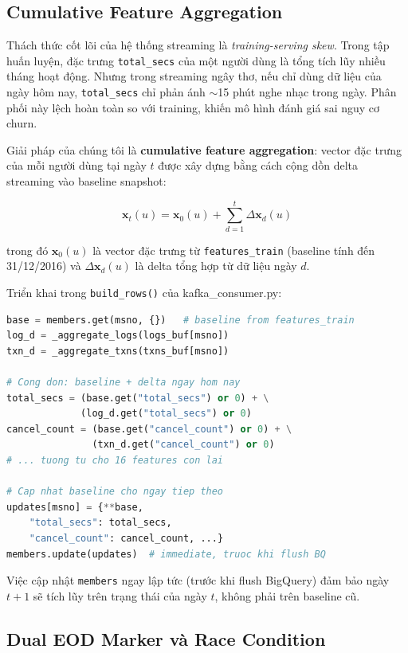 \documentclass[conference]{IEEEtran}
\begin{document}
\subsection{Cumulative Feature Aggregation}

Thách thức cốt lõi của hệ thống streaming là \emph{training-serving skew}.
Trong tập huấn luyện, đặc trưng \texttt{total\_secs} của một người dùng là
tổng tích lũy nhiều tháng hoạt động. Nhưng trong streaming ngây thơ, nếu chỉ
dùng dữ liệu của ngày hôm nay, \texttt{total\_secs} chỉ phản ánh $\sim$15
phút nghe nhạc trong ngày. Phân phối này lệch hoàn toàn so với training,
khiến mô hình đánh giá sai nguy cơ churn.

Giải pháp của chúng tôi là \textbf{cumulative feature aggregation}: vector
đặc trưng của mỗi người dùng tại ngày $t$ được xây dựng bằng cách cộng dồn
delta streaming vào baseline snapshot:

\begin{equation}
  \mathbf{x}_t(u) = \mathbf{x}_0(u) + \sum_{d=1}^{t} \Delta\mathbf{x}_d(u)
\end{equation}

trong đó $\mathbf{x}_0(u)$ là vector đặc trưng từ \texttt{features\_train}
(baseline tính đến 31/12/2016) và $\Delta\mathbf{x}_d(u)$ là delta tổng hợp
từ dữ liệu ngày $d$.

Triển khai trong \texttt{build\_rows()} của kafka\_consumer.py:

\begin{lstlisting}[language=Python, caption={Cumulative aggregation trong consumer}]
base = members.get(msno, {})   # baseline from features_train
log_d = _aggregate_logs(logs_buf[msno])
txn_d = _aggregate_txns(txns_buf[msno])

# Cong don: baseline + delta ngay hom nay
total_secs = (base.get("total_secs") or 0) + \
             (log_d.get("total_secs") or 0)
cancel_count = (base.get("cancel_count") or 0) + \
               (txn_d.get("cancel_count") or 0)
# ... tuong tu cho 16 features con lai

# Cap nhat baseline cho ngay tiep theo
updates[msno] = {**base,
    "total_secs": total_secs,
    "cancel_count": cancel_count, ...}
members.update(updates)  # immediate, truoc khi flush BQ
\end{lstlisting}

Việc cập nhật \texttt{members} ngay lập tức (trước khi flush BigQuery) đảm
bảo ngày $t+1$ sẽ tích lũy trên trạng thái của ngày $t$, không phải trên
baseline cũ.

\subsection{Dual EOD Marker và Race Condition}
\end{document}

